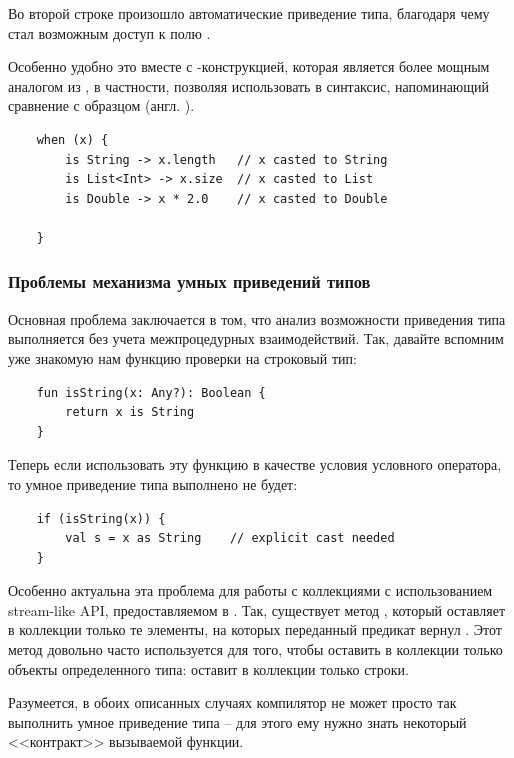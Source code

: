 Во второй строке произошло автоматические приведение типа, благодаря чему стал возможным доступ к полю .

Особенно удобно это вместе с -конструкцией, которая является более мощным аналогом  из , в частности, позволяя использовать в  синтаксис, напоминающий сравнение с образцом (англ. ).

\begin{verbatim}
    when (x) {
        is String -> x.length   // x casted to String
        is List<Int> -> x.size  // x casted to List
        is Double -> x * 2.0    // x casted to Double
        
    }
\end{verbatim}




\subsubsection{Проблемы механизма умных приведений типов}

Основная проблема заключается в том, что анализ возможности приведения типа выполняется без учета межпроцедурных взаимодействий. Так, давайте вспомним уже знакомую нам функцию проверки на строковый тип:

\begin{verbatim}
    fun isString(x: Any?): Boolean {
        return x is String
    }
\end{verbatim}

Теперь если использовать эту функцию в качестве условия условного оператора, то умное приведение типа выполнено не будет:

\begin{verbatim}
    if (isString(x)) {
        val s = x as String    // explicit cast needed
    }
\end{verbatim}

Особенно актуальна эта проблема для работы с коллекциями с использованием stream-like API, предоставляемом в . Так, существует метод , который оставляет в коллекции только те элементы, на которых переданный предикат вернул . Этот метод довольно часто используется для того, чтобы оставить в коллекции только объекты определенного типа:  оставит в коллекции  только строки.

Разумеется, в обоих описанных случаях компилятор не может просто так выполнить умное приведение типа -- для этого ему нужно знать некоторый <<контракт>> вызываемой функции. 

